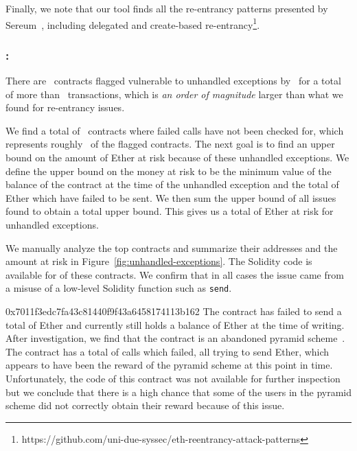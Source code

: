 Finally, we note that our tool finds all the re-entrancy patterns presented by Sereum~\cite{Rodler2019}, including delegated and create-based re-entrancy\footnote{https://github.com/uni-due-syssec/eth-reentrancy-attack-patterns}.



\subsubsection{\vue: \unhandledexceptions}
\label{ssec:analysis-ue}
There are~ contracts flagged vulnerable to unhandled exceptions by~\cite{Tsankov2018,Luu2016a,DBLP:conf/ndss/KalraGDS18} for a total of more than~ transactions, which is \emph{an order of magnitude} larger than what we found for re-entrancy issues.

We find a total of~ contracts where failed calls have not been checked for, which represents roughly~ of the flagged contracts. The next goal is to find an upper bound on the amount of Ether at risk because of these unhandled exceptions. We define the upper bound on the money at risk to be the minimum value of the balance of the contract at the time of the unhandled exception and the total of Ether which have failed to be sent. We then sum the upper bound of all issues found to obtain a total upper bound. This gives us a total of  Ether at risk for unhandled exceptions.

We manually analyze the top contracts and summarize their addresses and the amount at risk in Figure~\ref{fig:unhandled-exceptions}. The Solidity code is available for  of these contracts. We confirm that in all cases the issue came from a misuse of a low-level Solidity function such as \lstinline{send}.

\begin{investigation}{0x7011f3edc7fa43c81440f9f43a6458174113b162}
The contract {\small{}} has failed to send a total of  Ether and currently still holds a balance of  Ether at the time of writing. After investigation, we find that the contract is an abandoned pyramid scheme~\cite{ethereum-pyramid}. The contract has a total of  calls which failed, all trying to send  Ether, which appears to have been the reward of the pyramid scheme at this point in time. Unfortunately, the code of this contract was not available for further inspection but we conclude that there is a high chance that some of the users in the pyramid scheme did not correctly obtain their reward because of this issue.
\end{investigation}


